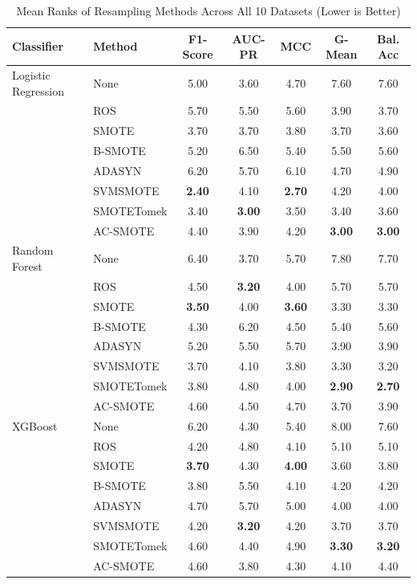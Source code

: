 \begin{table}[htbp]
\caption{Mean Ranks of Resampling Methods Across All 10 Datasets (Lower is Better)}
\label{tab:mean_ranks}
\centering
\begin{tabular}{llccccc}
\toprule
Classifier & Method & F1-Score & AUC-PR & MCC & G-Mean & Bal. Acc \\
\midrule
Logistic Regression & None & 5.00 & 3.60 & 4.70 & 7.60 & 7.60 \\
 & ROS & 5.70 & 5.50 & 5.60 & 3.90 & 3.70 \\
 & SMOTE & 3.70 & 3.70 & 3.80 & 3.70 & 3.60 \\
 & B-SMOTE & 5.20 & 6.50 & 5.40 & 5.50 & 5.60 \\
 & ADASYN & 6.20 & 5.70 & 6.10 & 4.70 & 4.90 \\
 & SVMSMOTE & \textbf{2.40} & 4.10 & \textbf{2.70} & 4.20 & 4.00 \\
 & SMOTETomek & 3.40 & \textbf{3.00} & 3.50 & 3.40 & 3.60 \\
 & AC-SMOTE & 4.40 & 3.90 & 4.20 & \textbf{3.00} & \textbf{3.00} \\
\midrule
Random Forest & None & 6.40 & 3.70 & 5.70 & 7.80 & 7.70 \\
 & ROS & 4.50 & \textbf{3.20} & 4.00 & 5.70 & 5.70 \\
 & SMOTE & \textbf{3.50} & 4.00 & \textbf{3.60} & 3.30 & 3.30 \\
 & B-SMOTE & 4.30 & 6.20 & 4.50 & 5.40 & 5.60 \\
 & ADASYN & 5.20 & 5.50 & 5.70 & 3.90 & 3.90 \\
 & SVMSMOTE & 3.70 & 4.10 & 3.80 & 3.30 & 3.20 \\
 & SMOTETomek & 3.80 & 4.80 & 4.00 & \textbf{2.90} & \textbf{2.70} \\
 & AC-SMOTE & 4.60 & 4.50 & 4.70 & 3.70 & 3.90 \\
\midrule
XGBoost & None & 6.20 & 4.30 & 5.40 & 8.00 & 7.60 \\
 & ROS & 4.20 & 4.80 & 4.10 & 5.10 & 5.10 \\
 & SMOTE & \textbf{3.70} & 4.30 & \textbf{4.00} & 3.60 & 3.80 \\
 & B-SMOTE & 3.80 & 5.50 & 4.10 & 4.20 & 4.20 \\
 & ADASYN & 4.70 & 5.70 & 5.00 & 4.00 & 4.00 \\
 & SVMSMOTE & 4.20 & \textbf{3.20} & 4.20 & 3.70 & 3.70 \\
 & SMOTETomek & 4.60 & 4.40 & 4.90 & \textbf{3.30} & \textbf{3.20} \\
 & AC-SMOTE & 4.60 & 3.80 & 4.30 & 4.10 & 4.40 \\
\bottomrule
\end{tabular}
\end{table}